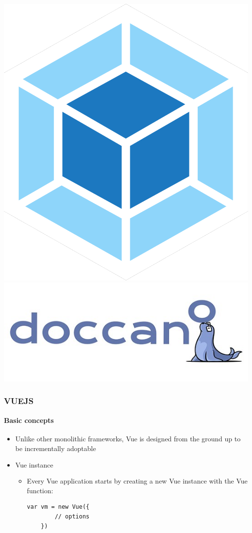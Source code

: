 \documentclass[10pt]{beamer}
\begin{document}
\begin{frame}
\begin{minipage}{0.55\textwidth}
        \includegraphics[scale=0.1]{webpack.png}
        \includegraphics[scale=0.35]{doccano.png}
    \end{minipage}
\end{frame}
\begin{frame}[fragile]
    \frametitle{\textbf{VUEJS}}
    \framesubtitle{\textbf{Basic concepts}}
    \begin{itemize}
        \item Unlike other monolithic frameworks, Vue is designed from the ground up to be incrementally adoptable
        \item Vue instance
        \begin{itemize}
            \item Every Vue application starts by creating a new Vue instance with the Vue function:
            \begin{lstlisting}[language=VueJS] 
    var vm = new Vue({
        // options
    })
            \end{lstlisting}
        \end{itemize}
    \end{itemize}
\end{frame}
\end{document}
